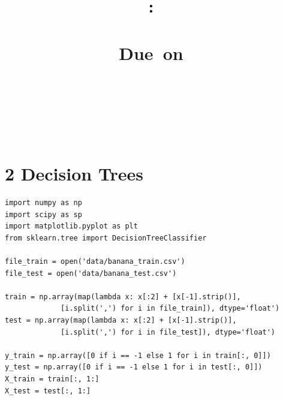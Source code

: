 \documentclass{article}
\title{
    \vspace{2in}
    \textmd{\textbf{\hmwkClass:\ \hmwkTitle \\ \hmwksubtitle }}\\
    \vspace{1in}
    \normalsize\vspace{0.1in}\small{Due\ on\ \hmwkDueDate}\\
    \vspace{0.1in}\large{\textit{\hmwkClassInstructor}}\\
    \vspace{3in}
    \author{\textbf{\hmwkAuthorName} \\ \textbf{\hmwknetid }\\ }
    \vspace{0.2in}
    \gihub
}
\date{}
\newenvironment{problem}[2][$\bullet$]{\begin{trivlist}\large
		\item[\hskip \labelsep {\bfseries #1}\hskip \labelsep {\bfseries #2.}]}  {\end{trivlist}}
\newenvironment{sub}[2][$-$]{\begin{trivlist}
		\item[\hskip \labelsep {\bfseries #1}\hskip \labelsep {\bfseries #2.}]}  {\end{trivlist}}
\begin{document}
\maketitle

\pagebreak
\section{2 Decision Trees}
\begin{problem}{2.1 Trees on the Banana Dataset}
\end{problem}

\begin{sub}{2.1.1}
\end{sub}

\begin{verbatim}
import numpy as np
import scipy as sp
import matplotlib.pyplot as plt
from sklearn.tree import DecisionTreeClassifier

file_train = open('data/banana_train.csv')
file_test = open('data/banana_test.csv')

train = np.array(map(lambda x: x[:2] + [x[-1].strip()],
			 [i.split(',') for i in file_train]), dtype='float')
test = np.array(map(lambda x: x[:2] + [x[-1].strip()],
			 [i.split(',') for i in file_test]), dtype='float')

y_train = np.array([0 if i == -1 else 1 for i in train[:, 0]])
y_test = np.array([0 if i == -1 else 1 for i in test[:, 0]])
X_train = train[:, 1:]
X_test = test[:, 1:]
\end{verbatim}

\begin{sub}{2.1.2}
\end{sub}
\end{document}
